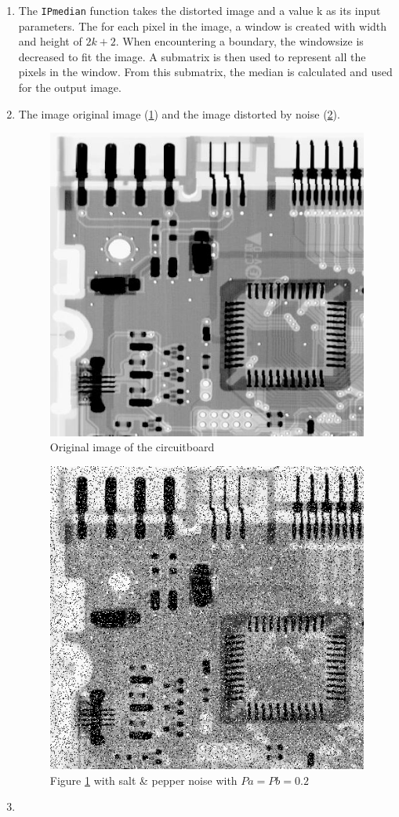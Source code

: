 \documentclass[a4paper]{article}
\begin{document}
\begin{enumerate}
\item
The \lstinline|IPmedian| function takes the distorted image and a value k as its input parameters.
The for each pixel in the image, a window is created with width and height of $2k+2$.
When encountering a boundary, the windowsize is decreased to fit the image.
A submatrix is then used to represent all the pixels in the window.
From this submatrix, the median is calculated and used for the output image.

\item
The image original image (\ref{fig:circuit}) and the image distorted by noise (\ref{fig:noise}).
\begin{figure}[H]
\centering
\includegraphics[width=.5\textwidth]{../lab2ex3/circuitboard.png}
\caption{Original image of the circuitboard}
\label{fig:circuit}
\end{figure}
\begin{figure}[H]
\centering
\includegraphics[width=.5\textwidth]{../lab2ex3/noise.png}
\caption{Figure \ref{fig:circuit} with salt \& pepper noise with $Pa = Pb = 0.2$}
\label{fig:noise}
\end{figure}
\item
\begin{figure}[H]

\end{figure}
\end{enumerate}
\end{document}
